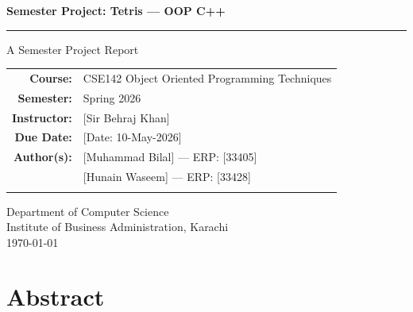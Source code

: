 \documentclass[11pt]{article}
\newcommand{\mytitle}{Semester Project: Tetris — OOP C++}
\newcommand{\mycourse}{CSE142 Object Oriented Programming Techniques}
\newcommand{\mysemester}{Spring 2026}
\newcommand{\myinstructor}{[Sir Behraj Khan]}
\newcommand{\authorone}{[Muhammad Bilal] --- ERP: [33405]}
\newcommand{\authortwo}{[Hunain Waseem] --- ERP: [33428]}
\newcommand{\authorthree}{}
\newcommand{\duedate}{[Date: 10-May-2026]}
\begin{document}

\thispagestyle{firstpage}
\begin{center}
    \vspace*{0.5cm}

    {\Huge\bfseries\textcolor{primary}{\mytitle}}

    \vspace{0.5cm}
    \rule{0.9\textwidth}{1pt}
    \vspace{0.5cm}

    {\Large A Semester Project Report}

    \vspace{1cm}

    \begin{tabular}{rl}
        \textbf{Course:}     & \mycourse     \\[4pt]
        \textbf{Semester:}   & \mysemester   \\[4pt]
        \textbf{Instructor:} & \myinstructor \\[4pt]
        \textbf{Due Date:}   & \duedate      \\[4pt]
        \textbf{Author(s):}  & \authorone    \\[2pt]
                             & \authortwo    \\[2pt]
                             & \authorthree  \\
    \end{tabular}

    \vspace{1.5cm}


    \vfill

    {\large Department of Computer Science}\\[4pt]
    {\large Institute of Business Administration, Karachi}\\[6pt]
    \today
\end{center}

\newpage

\section*{Abstract}
\end{document}
